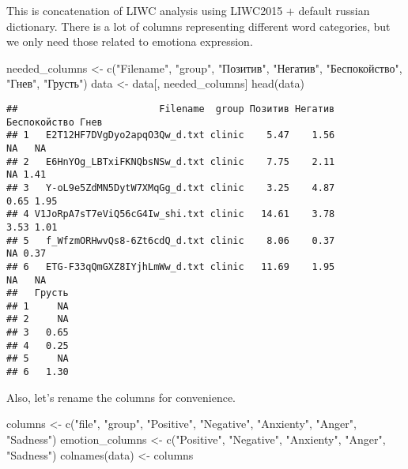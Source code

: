 \documentclass[
]{article}
\newenvironment{Shaded}{\begin{snugshade}}{\end{snugshade}}
\newcommand{\FunctionTok}[1]{\textcolor[rgb]{0.00,0.00,0.00}{#1}}
\newcommand{\NormalTok}[1]{#1}
\newcommand{\OtherTok}[1]{\textcolor[rgb]{0.56,0.35,0.01}{#1}}
\newcommand{\StringTok}[1]{\textcolor[rgb]{0.31,0.60,0.02}{#1}}
\begin{document}
This is concatenation of LIWC analysis using LIWC2015 + default russian
dictionary. There is a lot of columns representing different word
categories, but we only need those related to emotiona expression.

\begin{Shaded}
\begin{Highlighting}[]
\NormalTok{needed\_columns }\OtherTok{\textless{}{-}} \FunctionTok{c}\NormalTok{(}\StringTok{"Filename"}\NormalTok{, }\StringTok{"group"}\NormalTok{, }\StringTok{"Позитив"}\NormalTok{, }\StringTok{"Негатив"}\NormalTok{, }\StringTok{"Беспокойство"}\NormalTok{, }\StringTok{"Гнев"}\NormalTok{, }\StringTok{"Грусть"}\NormalTok{)}
\NormalTok{data }\OtherTok{\textless{}{-}}\NormalTok{ data[, needed\_columns]}
\FunctionTok{head}\NormalTok{(data)}
\end{Highlighting}
\end{Shaded}

\begin{verbatim}
##                         Filename  group Позитив Негатив Беспокойство Гнев
## 1   E2T12HF7DVgDyo2apqO3Qw_d.txt clinic    5.47    1.56           NA   NA
## 2   E6HnYOg_LBTxiFKNQbsNSw_d.txt clinic    7.75    2.11           NA 1.41
## 3   Y-oL9e5ZdMN5DytW7XMqGg_d.txt clinic    3.25    4.87         0.65 1.95
## 4 V1JoRpA7sT7eViQ56cG4Iw_shi.txt clinic   14.61    3.78         3.53 1.01
## 5   f_WfzmORHwvQs8-6Zt6cdQ_d.txt clinic    8.06    0.37           NA 0.37
## 6   ETG-F33qQmGXZ8IYjhLmWw_d.txt clinic   11.69    1.95           NA   NA
##   Грусть
## 1     NA
## 2     NA
## 3   0.65
## 4   0.25
## 5     NA
## 6   1.30
\end{verbatim}

Also, let's rename the columns for convenience.

\begin{Shaded}
\begin{Highlighting}[]
\NormalTok{columns }\OtherTok{\textless{}{-}} \FunctionTok{c}\NormalTok{(}\StringTok{"file"}\NormalTok{, }\StringTok{"group"}\NormalTok{, }\StringTok{"Positive"}\NormalTok{, }\StringTok{"Negative"}\NormalTok{, }\StringTok{"Anxienty"}\NormalTok{, }\StringTok{"Anger"}\NormalTok{, }\StringTok{"Sadness"}\NormalTok{)}
\NormalTok{emotion\_columns }\OtherTok{\textless{}{-}} \FunctionTok{c}\NormalTok{(}\StringTok{"Positive"}\NormalTok{, }\StringTok{"Negative"}\NormalTok{, }\StringTok{"Anxienty"}\NormalTok{, }\StringTok{"Anger"}\NormalTok{, }\StringTok{"Sadness"}\NormalTok{)}
\FunctionTok{colnames}\NormalTok{(data) }\OtherTok{\textless{}{-}}\NormalTok{ columns}
\end{Highlighting}
\end{Shaded}
\end{document}
